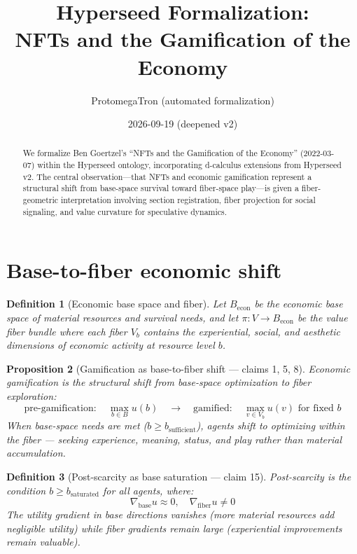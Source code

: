 \documentclass[11pt,a4paper]{article}
\title{Hyperseed Formalization:\\
  NFTs and the Gamification of the Economy}
\author{ProtomegaTron (automated formalization)}
\date{2026-09-19 (deepened v2)}
\newtheorem{definition}{Definition}[section]
\newtheorem{proposition}[definition]{Proposition}
\begin{document}
\maketitle

\begin{abstract}
We formalize Ben Goertzel's ``NFTs and the Gamification of the Economy''
(2022-03-07) within the Hyperseed ontology, incorporating d-calculus
extensions from Hyperseed v2. The central observation---that NFTs and
economic gamification represent a structural shift from base-space
survival toward fiber-space play---is given a fiber-geometric
interpretation involving section registration, fiber projection for
social signaling, and value curvature for speculative dynamics.
\end{abstract}

\tableofcontents

\section{Base-to-fiber economic shift}

\begin{definition}[Economic base space and fiber]
Let $B_{\text{econ}}$ be the \emph{economic base space} of material
resources and survival needs, and let $\pi : V \to B_{\text{econ}}$ be
the \emph{value fiber bundle} where each fiber $V_b$ contains the
experiential, social, and aesthetic dimensions of economic activity
at resource level $b$.
\end{definition}

\begin{proposition}[Gamification as base-to-fiber shift --- claims 1, 5, 8]
\label{prop:gamification}
Economic gamification is the structural shift from base-space optimization
to fiber exploration:
\[
  \text{pre-gamification}: \quad \max_{b \in B} u(b)
  \quad \longrightarrow \quad
  \text{gamified}: \quad \max_{v \in V_b} u(v) \text{ for fixed } b
\]
When base-space needs are met ($b \geq b_{\text{sufficient}}$), agents
shift to optimizing within the fiber --- seeking experience, meaning,
status, and play rather than material accumulation.
\end{proposition}

\begin{definition}[Post-scarcity as base saturation --- claim 15]
Post-scarcity is the condition $b \geq b_{\text{saturated}}$ for all
agents, where:
\[
  \nabla_{\text{base}} u \approx 0, \quad
  \nabla_{\text{fiber}} u \neq 0
\]
The utility gradient in base directions vanishes (more material resources
add negligible utility) while fiber gradients remain large (experiential
improvements remain valuable).
\end{definition}
\end{document}
